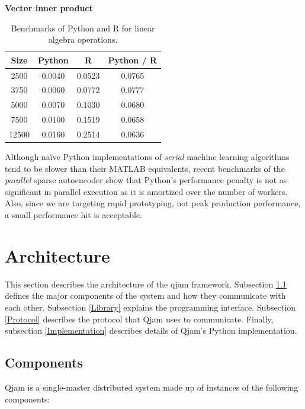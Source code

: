 \documentclass[%
  final,
  notitlepage,
  narroweqnarray,
  inline,
]{ieee}
\begin{document}
\begin{table}[h!]
\begin{center}
    \vspace{1em}
    \textbf{Vector inner product} \\
    \begin{tabular}{cccc}
      Size  & Python &  R       & Python / R \\
      \hline
      2500  & 0.0040 & 0.0523 & 0.0765 \\
      3750  & 0.0060 & 0.0772 & 0.0777 \\
      5000  & 0.0070 & 0.1030 & 0.0680 \\
      7500  & 0.0100 & 0.1519 & 0.0658 \\
      12500 & 0.0160 & 0.2514 & 0.0636 \\
    \end{tabular}
  \end{center}
  \caption{Benchmarks of Python and R for linear algebra
    operations.}
  \label{PythonvsR}
\end{table}

Although na\"{i}ve Python implementations of {\it serial} machine learning
algorithms tend to be slower than their MATLAB equivalents, recent benchmarks
of the {\it parallel} sparse autoencoder show that Python's performance penalty
is not as significant in parallel execution as it is amortized over the number
of workers. Also, since we are targeting rapid prototyping, not peak production
performance, a small performance hit is acceptable.

\section{Architecture}

This section describes the architecture of the qjam framework. Subsection
\ref{Components} defines the major components of the system and how they
communicate with each other. Subsection \ref{Library} explains the programming
interface. Subsection \ref{Protocol} describes the protocol that Qjam uses to
communicate. Finally, subsection \ref{Implementation} describes details of
Qjam's Python implementation.

\subsection{Components}
\label{Components}

Qjam is a single-master distributed system made up of instances of the
following components: \\
\end{document}
